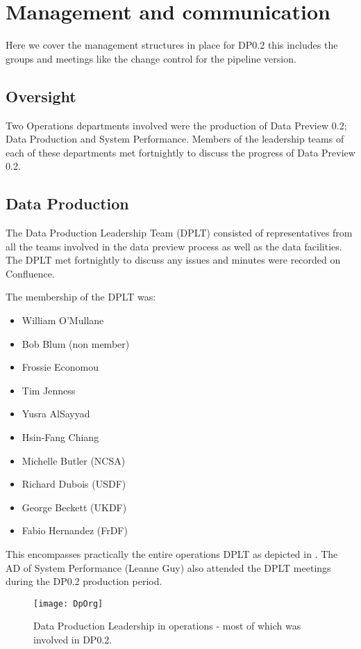 \section{Management and communication} \label{sec:management}

Here we cover the management structures in place for DP0.2 this includes the groups and meetings like the change control for the pipeline version.

\subsection{Oversight}
Two Operations departments involved were the production of Data Preview 0.2; Data Production and System Performance.
Members of the leadership teams of each of these departments met fortnightly to discuss the progress of Data Preview 0.2. 

\subsection{Data Production}
The Data Production Leadership Team (DPLT) consisted of representatives from all the teams involved in the data preview process as well as the data facilities.
The DPLT met fortnightly to discuss any issues and minutes were recorded on Confluence.

The membership of the DPLT was:
\begin{itemize}
\item William O'Mullane
\item Bob Blum (non member)
\item Frossie Economou
\item Tim Jenness
\item Yusra AlSayyad
\item Hsin-Fang Chiang
\item Michelle Butler (NCSA)
\item Richard Dubois (USDF)
\item George Beckett (UKDF)
\item Fabio Hernandez (FrDF)
\end{itemize}

This encompasses practically the entire operations DPLT as depicted in . 
The AD of System Performance (Leanne Guy) also attended the DPLT meetings during the DP0.2 production period. 

\begin{figure}
\texttt{[image: DpOrg]}
\caption{Data Production Leadership in operations - most of which was involved in DP0.2. \label{fig:DpOrg}}
\end{figure}

